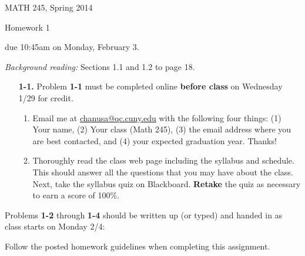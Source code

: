\documentclass[12pt]{article}
\begin{document}
\pagestyle{empty}

\begin{center}\large 
MATH 245, Spring 2014

{\sc Homework 1}

due 10:45{\sc am} on Monday, February 3.
\end{center}

\noindent
{\em Background reading:} Sections 1.1 and 1.2 to page 18.


\begin{enumerate}
\item[\bf 1-1.] Problem {\bf 1-1} must be completed online {\bf before class} on Wednesday 1/29 for credit.
\begin{enumerate}
\item Email me at \url{chanusa@qc.cuny.edu} with the following four things: (1) Your name, (2) Your class (Math 245), (3) the email address where you are best contacted, and (4) your expected graduation year. Thanks!
\item Thoroughly read the class web page including the syllabus and schedule. This should answer all the questions that you may have about the class.  Next, take the syllabus quiz on Blackboard.  {\bf Retake} the quiz as necessary to earn a score of 100\%. 
\end{enumerate}
\end{enumerate}
Problems {\bf 1-2} through {\bf 1-4} should be written up (or typed) and handed in as class starts on Monday 2/4:

\smallskip\noindent
{\color{red} Follow the posted homework guidelines when completing this assignment.}
\end{document}
